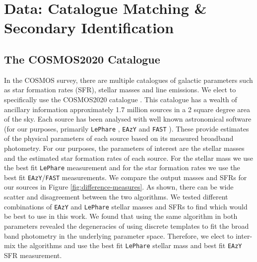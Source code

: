 \section{Data: Catalogue Matching \& Secondary Identification} \label{data}
\subsection{The COSMOS2020 Catalogue}
In the COSMOS survey, there are multiple catalogues of galactic parameters such as star formation rates (SFR), stellar masses and line emissions. We elect to specifically use the COSMOS2020 catalogue \citep{2022ApJS..258...11W}. This catalogue has a wealth of ancillary information approximately 1.7 million sources in a 2 square degree area of the sky. Each source has been analysed with well known astronomical software (for our purposes, primarily \texttt{\texttt{LePhare}} \citep{1999MNRAS.310..540A, 2006A&A...457..841I}, \texttt{\texttt{EAzY}} \citep{2008ApJ...686.1503B} and \texttt{\texttt{FAST}} \citep{2017MNRAS.465.3390A}). These provide estimates of the physical parameters of each source based on its measured broadband photometry. For our purposes, the parameters of interest are the stellar masses and the estimated star formation rates of each source. For the stellar mass we use the best fit \texttt{LePhare} measurement and for the star formation rates we use the best fit \texttt{EAzY}/\texttt{FAST} measurements. We compare the output masses and SFRs for our sources in Figure \ref{fig:difference-measures}. As shown, there can be wide scatter and disagreement between the two algorithms. We tested different combinations of \texttt{EAzY} and \texttt{LePhare} stellar masses and SFRs to find which would be best to use in this work. We found that using the same algorithm in both parameters revealed the degeneracies of using discrete templates to fit the broad band photometry in the underlying parameter space. Therefore, we elect to inter-mix the algorithms and use the best fit \texttt{LePhare} stellar mass and best fit \texttt{EAzY} SFR measurement.

